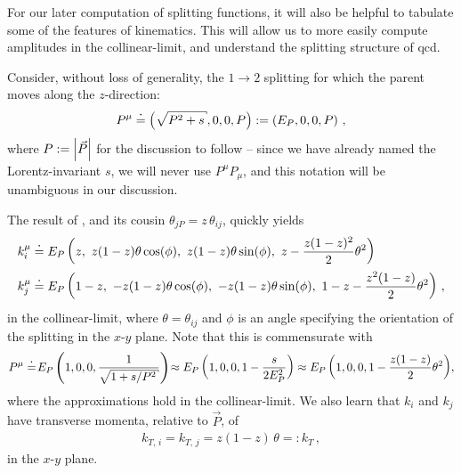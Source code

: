 For our later computation of splitting functions, it will also be helpful to tabulate some of the features of  kinematics.
%
This will allow us to more easily compute amplitudes in the \gls{collinear-limit}, and understand the splitting structure of \gls{qcd}.
\begin{example}
    \label{ex:collinear-kinematics}
    Consider, without loss of generality, the \(1 \to 2\)  splitting for which the parent moves along the \(z\)-direction:
    \begin{align}
        P^\mu
        \reppedby
        \le(\sqrt{P^2 + s}, 0, 0, P\ri)
        :=
        \le(E_P, 0, 0, P\ri)
        \,,
    \end{align}
    where \(P := \abs{\vec{P}}\) for the discussion to follow -- since we have already named the Lorentz-invariant \(s\), we will never use \(P^\mu P_\mu\), and this notation will be unambiguous in our discussion.

    The result of , and its cousin \(\theta_{jP} = z \, \theta_{ij}\), quickly yields
    \begin{align}
        k_i^\mu
        &\overset{\boldsymbol{\cdot}}{=}
        E_P \left(z, \,\, z(1-z)\theta \cos(\phi), \,\, z(1-z)\theta \sin(\phi), \,\, z - \frac{z(1-z)^2}{2}\theta^2\right)
        \\
        k_j^\mu
        &\overset{\boldsymbol{\cdot}}{=}
        E_P \left(1-z, \,\, -z(1-z)\theta \cos(\phi), \,\, -z(1-z)\theta \sin(\phi), \,\, 1-z - \frac{z^2(1-z)}{2}\theta^2\right)
        \,,
    \end{align}
    in the \gls{collinear-limit}, where \(\theta = \theta_{ij}\) and \(\phi\) is an angle specifying the orientation of the splitting in the \(x\)-\(y\) plane.
    Note that this is commensurate with
    \begin{align}
        P^\mu
        \reppedby
        \!
        E_P \le(1, 0, 0, \frac{1}{\sqrt{1 + s/P^2}}\ri)
        \!
        \approx
        E_P \le(1, 0, 0, 1 - \frac{s}{2 E_P^2}\ri)
        \approx
        E_P \le(1, 0, 0, 1 - \frac{z(1-z)}{2} \theta^2\ri)
        \!
        ,
    \end{align}
    where the approximations hold in the \gls{collinear-limit}.
    We also learn that \(k_i\) and \(k_j\) have transverse momenta, relative to \(\vec{P}\), of
    \begin{align}
        k_{T,\,i}
        =
        k_{T,\,j}
        =
        z(1-z)\, \theta
        =:
        k_T
        \,,
    \end{align}
    in the \(x\)-\(y\) plane.
\end{example}

